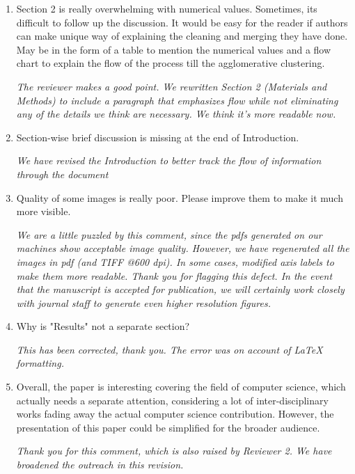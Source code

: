 \documentclass[11pt, oneside]{article}   	%
\begin{document}
\begin{enumerate}
    
\item Section 2 is really overwhelming with numerical values. Sometimes, its difficult to follow up the discussion. It would be easy for the reader if authors can make unique way of explaining the cleaning and merging they have done. May be in the form of a table to mention the numerical values and a flow chart to explain the flow of the process till the agglomerative clustering.  

\emph{The reviewer makes a good point. We rewritten Section 2 (Materials and Methods) to include a paragraph that emphasizes flow while not eliminating any of the details we think are necessary. We think it's more readable now.}

\item Section-wise brief discussion is missing at the end of Introduction.

\emph{We have revised the Introduction to better track the flow of information through the document}

\item Quality of some images is really poor. Please improve them to make it much more visible.

\emph {We are a little puzzled by this comment, since the pdfs generated on our machines show acceptable image quality. However, we have regenerated all the images in pdf (and TIFF @600 dpi). In some cases, modified axis labels to make them more readable. Thank you for flagging this defect. In the event that the manuscript is accepted for publication, we will certainly work closely with journal staff to generate even higher resolution figures.}

\item Why is "Results" not a separate section?

\emph{This has been corrected, thank you. The error was on account of LaTeX formatting.}

\item Overall, the paper is interesting covering the field of computer science, which actually needs a separate attention, considering a lot of inter-disciplinary works fading away the actual computer science contribution. However, the presentation of this paper could be simplified for the broader audience.

\emph{Thank you for this comment, which is also raised by Reviewer 2. We have broadened the outreach in this revision.}
\end{enumerate}
\clearpage
\end{document}
